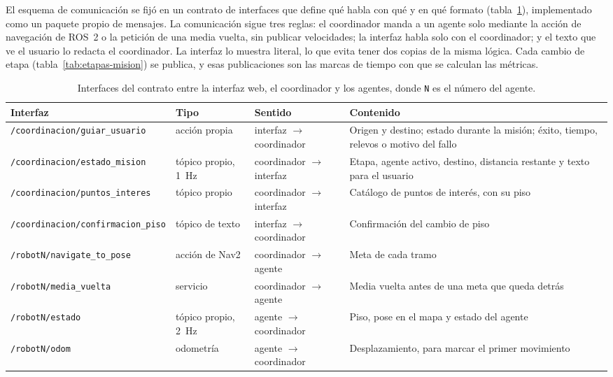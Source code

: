 El esquema de comunicación se fijó en un contrato de interfaces que define qué habla con qué y en qué formato (tabla~\ref{tab:contrato}), implementado como un paquete propio de mensajes. La comunicación sigue tres reglas: el coordinador manda a un agente solo mediante la acción de navegación de ROS~2 o la petición de una media vuelta, sin publicar velocidades; la interfaz habla solo con el coordinador; y el texto que ve el usuario lo redacta el coordinador. La interfaz lo muestra literal, lo que evita tener dos copias de la misma lógica. Cada cambio de etapa (tabla~\ref{tab:etapas-mision}) se publica, y esas publicaciones son las marcas de tiempo con que se calculan las métricas.

\begin{table}[H]
  \centering\footnotesize
  \caption{Interfaces del contrato entre la interfaz web, el coordinador y los agentes, donde \texttt{N} es el número del agente.}
  \label{tab:contrato}
  \begin{tabular}{@{}>{\scriptsize}p{}p{}p{}p{}@{}}
    \toprule
    \footnotesize\textbf{Interfaz} & \textbf{Tipo} & \textbf{Sentido} & \textbf{Contenido} \\ \midrule
    \texttt{/coordinacion/guiar\_usuario} & acción propia & interfaz $\rightarrow$ coordinador & Origen y destino; estado durante la misión; éxito, tiempo, relevos o motivo del fallo \\
    \texttt{/coordinacion/estado\_mision} & tópico propio, 1~Hz & coordinador $\rightarrow$ interfaz & Etapa, agente activo, destino, distancia restante y texto para el usuario \\
    \texttt{/coordinacion/puntos\_interes} & tópico propio & coordinador $\rightarrow$ interfaz & Catálogo de puntos de interés, con su piso \\
    \texttt{/coordinacion/confirmacion\_piso} & tópico de texto & interfaz $\rightarrow$ coordinador & Confirmación del cambio de piso \\
    \texttt{/robotN/navigate\_to\_pose} & acción de Nav2 & coordinador $\rightarrow$ agente & Meta de cada tramo \\
    \texttt{/robotN/media\_vuelta} & servicio & coordinador $\rightarrow$ agente & Media vuelta antes de una meta que queda detrás \\
    \texttt{/robotN/estado} & tópico propio, 2~Hz & agente $\rightarrow$ coordinador & Piso, pose en el mapa y estado del agente \\
    \texttt{/robotN/odom} & odometría & agente $\rightarrow$ coordinador & Desplazamiento, para marcar el primer movimiento \\ \bottomrule
  \end{tabular}
\end{table}


